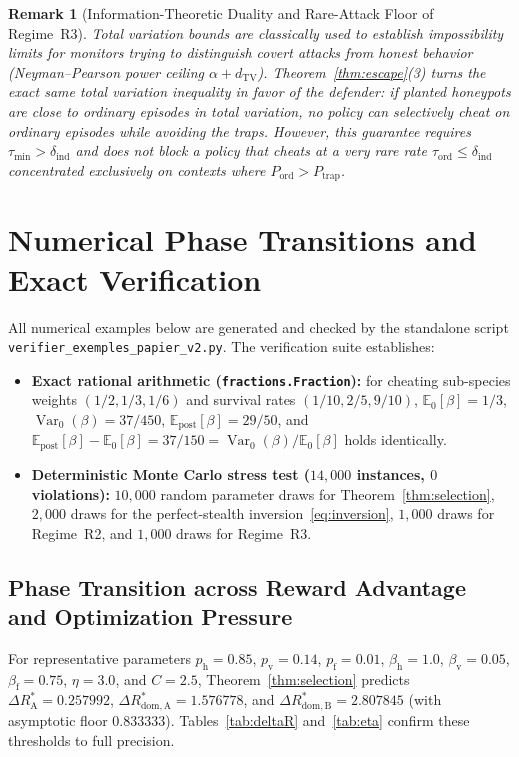 \documentclass[11pt,a4paper]{article}
\newtheorem{remark}[theorem]{Remark}
\newcommand{\E}{\mathbb{E}}
\newcommand{\Var}{\operatorname{Var}}
\newcommand{\dTV}{d_{\mathrm{TV}}}
\begin{document}
\begin{remark}[Information-Theoretic Duality and Rare-Attack Floor of Regime~R3]
Total variation bounds are classically used to establish impossibility limits for \emph{monitors} trying to distinguish covert attacks from honest behavior (Neyman--Pearson power ceiling $\alpha + \dTV$). Theorem~\ref{thm:escape}(3) turns the exact same total variation inequality in favor of the \emph{defender}: if planted honeypots are close to ordinary episodes in total variation, no policy can selectively cheat on ordinary episodes while avoiding the traps. However, this guarantee requires $\tau_{\min} > \delta_{\mathrm{ind}}$ and does not block a policy that cheats at a very rare rate $\tau_{\mathrm{ord}} \le \delta_{\mathrm{ind}}$ concentrated exclusively on contexts where $P_{\mathrm{ord}} > P_{\mathrm{trap}}$.
\end{remark}

\section{Numerical Phase Transitions and Exact Verification}

All numerical examples below are generated and checked by the standalone script \texttt{verifier\_exemples\_papier\_v2.py}. The verification suite establishes:
\begin{itemize}
  \item \textbf{Exact rational arithmetic (\texttt{fractions.Fraction}):} for cheating sub-species weights $(1/2, 1/3, 1/6)$ and survival rates $(1/10, 2/5, 9/10)$, $\E_0[\beta] = 1/3$, $\Var_0(\beta) = 37/450$, $\E_{\mathrm{post}}[\beta] = 29/50$, and $\E_{\mathrm{post}}[\beta] - \E_0[\beta] = 37/150 = \Var_0(\beta)/\E_0[\beta]$ holds identically.
  \item \textbf{Deterministic Monte Carlo stress test ($14{,}000$ instances, $0$ violations):} $10{,}000$ random parameter draws for Theorem~\ref{thm:selection}, $2{,}000$ draws for the perfect-stealth inversion~\eqref{eq:inversion}, $1{,}000$ draws for Regime~R2, and $1{,}000$ draws for Regime~R3.
\end{itemize}

\subsection{Phase Transition across Reward Advantage and Optimization Pressure}

For representative parameters $p_{\mathrm{h}} = 0.85$, $p_{\mathrm{v}} = 0.14$, $p_{\mathrm{f}} = 0.01$, $\beta_{\mathrm{h}} = 1.0$, $\beta_{\mathrm{v}} = 0.05$, $\beta_{\mathrm{f}} = 0.75$, $\eta = 3.0$, and $C = 2.5$, Theorem~\ref{thm:selection} predicts $\Delta R_{\mathrm{A}}^* = 0.257992$, $\Delta R_{\mathrm{dom, A}}^* = 1.576778$, and $\Delta R_{\mathrm{dom, B}}^* = 2.807845$ (with asymptotic floor $0.833333$). Tables~\ref{tab:deltaR} and~\ref{tab:eta} confirm these thresholds to full precision.
\end{document}
